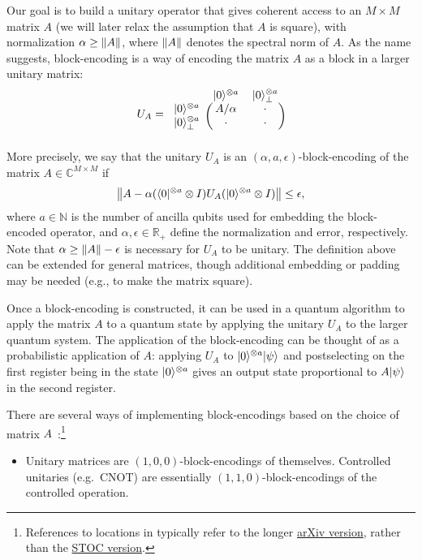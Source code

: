 \begin{refsection}
Our goal is to build a unitary operator that gives coherent access to an $M\times M$ matrix $A$ (we will later relax the assumption that $A$ is square), with normalization $\alpha \geq \lVert A\rVert$, where $\lVert A\rVert$ denotes the spectral norm of $A$. As the name suggests, block-encoding is a way of encoding the matrix $A$ as a block in a larger unitary matrix:
\begin{equation}
U_A = 
\begin{blockarray}{ccc}
& \ket{0}^{\otimes a}  & \ket{0}^{\otimes a}_\perp \\
\begin{block}{c(cc)}
  \ket{0}^{\otimes a} & A/\alpha & \cdot \\
  \ket{0}^{\otimes a}_\perp & \cdot & \cdot \\
\end{block}
\end{blockarray}
\end{equation}
More precisely, we say that the unitary $U_A$ is an $(\alpha, a, \epsilon)$-block-encoding of the matrix $A\in\mathbb{C}^{M\times M}$ if 
\begin{equation}\label{eq:BEDef}
\left\lVert A - \alpha (\langle0\rvert^{\otimes a} \otimes I )U_A(\lvert0\rangle^{\otimes a} \otimes I)\right\rVert \leq \epsilon,
\end{equation}
where $a\in\mathbb{N}$ is the number of ancilla qubits used for embedding the block-encoded operator, and $\alpha,\epsilon\in\mathbb{R}_+$ define the normalization and error, respectively. Note that $\alpha\geq \lVert A\rVert-\epsilon$ is necessary for $U_A$ to be unitary. 
The definition above can be extended for general matrices, though additional embedding or padding may be needed (e.g., to make the matrix square).

Once a block-encoding is constructed, it can be used in a quantum algorithm to apply the matrix $A$ to a quantum state by applying the unitary $U_A$ to the larger quantum system. The application of the block-encoding can be thought of as a probabilistic application of $A$: applying $U_A$ to $\lvert0\rangle^{\otimes a}\lvert\psi\rangle$ and postselecting on the first register being in the state $\lvert0\rangle^{\otimes a}$ gives an output state proportional to $A\lvert\psi\rangle$ in the second register.

There are several ways of implementing block-encodings based on the choice of matrix $A$~\cite[Section 4.2]{gilyen2018QSingValTransf}:\footnote{References to locations in \cite{gilyen2018QSingValTransf} typically refer to the longer \href{https://arxiv.org/abs/1806.01838}{arXiv version}, rather than the \href{http://dx.doi.org/10.1145/3313276.3316366}{STOC version}.}
\begin{itemize}
\item Unitary matrices are $(1,0,0)$-block-encodings of themselves. Controlled unitaries (e.g.~$\mathrm{CNOT}$) are essentially $(1,1,0)$-block-encodings of the controlled operation.


\end{itemize}
\end{refsection}

